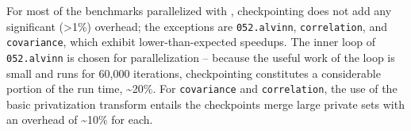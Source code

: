 




For most of the benchmarks parallelized with \namensp, checkpointing does not add any
significant (>1\%) overhead; the exceptions are
\texttt{052.alvinn}, \texttt{correlation}, and \texttt{covariance}, which
exhibit lower-than-expected speedups. %
The inner loop of \texttt{052.alvinn} is chosen for parallelization --
because the useful work of the loop is small and runs for 60,000
iterations, checkpointing constitutes a considerable portion of the run
time, \textasciitilde20\%. For \texttt{covariance} and \texttt{correlation},
the use of the basic privatization transform entails the checkpoints merge large private sets
with an overhead of \textasciitilde10\% for each.

